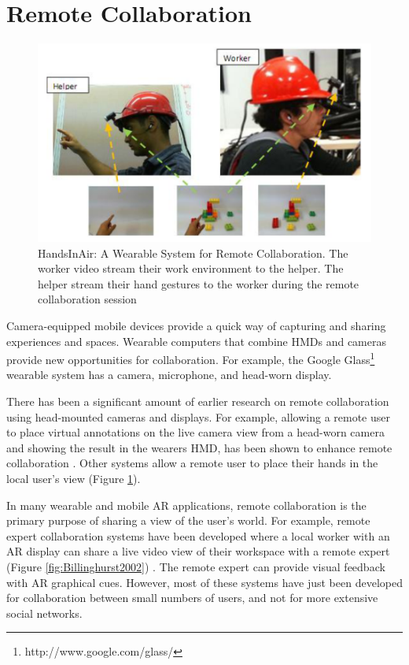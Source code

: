 \section{Remote Collaboration}

\begin{figure}
    \centering
    \includegraphics[width=\linewidth]{images/Huang2013.PNG}
    \caption{HandsInAir: A Wearable System for Remote Collaboration. The worker video stream their work environment to the helper. The helper stream their hand gestures to the worker during the remote collaboration session \cite{Huang2013}}
    \label{fig:HandsInAir}
\end{figure}

Camera-equipped mobile devices provide a quick way of capturing and sharing experiences and spaces. Wearable computers that combine HMDs and cameras provide new opportunities for collaboration. For example, the Google Glass\footnote{http://www.google.com/glass/} wearable system has a camera, microphone, and head-worn display.

There has been a significant amount of earlier research on remote collaboration using head-mounted cameras and displays. For example, allowing a remote user to place virtual annotations on the live camera view from a head-worn camera and showing the result in the wearers HMD, has been shown to enhance remote collaboration \cite{Fussell2003}. Other systems allow a remote user to place their hands in the local user's view \cite{Huang2013} (Figure \ref{fig:HandsInAir}). 

In many wearable and mobile AR applications, remote collaboration is the primary purpose of sharing a view of the user's world. For example, remote expert collaboration systems have been developed where a local worker with an AR display can share a live video view of their workspace with a remote expert (Figure \ref{fig:Billinghurst2002}) \cite{Billinghurst2002}. The remote expert can provide visual feedback with AR graphical cues.  However, most of these systems have just been developed for collaboration between small numbers of users, and not for more extensive social networks. 

